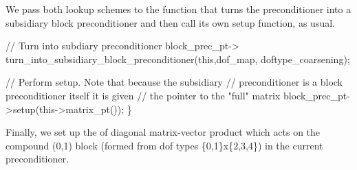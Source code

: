 We pass both lookup schemes to the function that turns the preconditioner into a subsidiary block preconditioner and then call its own setup function, as usual.


\begin{DoxyCodeInclude}
      
   \textcolor{comment}{// Turn into subdiary preconditioner}
   block\_prec\_pt->
    turn\_into\_subsidiary\_block\_preconditioner(\textcolor{keyword}{this},dof\_map,
                                              doftype\_coarsening);

   \textcolor{comment}{// Perform setup. Note that because the subsidiary}
   \textcolor{comment}{// preconditioner is a block preconditioner itself it is given}
   \textcolor{comment}{// the pointer to the "full" matrix}
   block\_prec\_pt->setup(this->matrix\_pt());
  \}

\end{DoxyCodeInclude}


Finally, we set up the of diagonal matrix-\/vector product which acts on the compound (0,1) block (formed from dof types \{0,1\}x\{2,3,4\}) in the current preconditioner.


